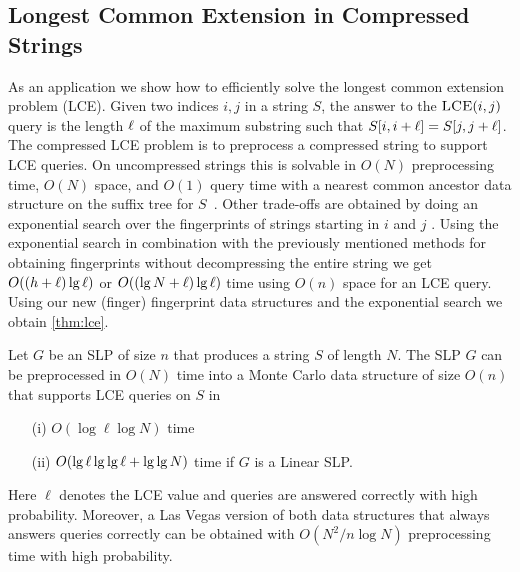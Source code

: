 \subsection*{Longest Common Extension in Compressed Strings}
As an application we show how to efficiently solve the longest common extension problem (LCE).
Given two indices $i, j$ in a string $S$, the answer to the $\textsc{LCE}(i, j)$ query is the length $\ell$ of the maximum substring such that $S[i, i+\ell] = S[j, j+\ell]$. The compressed LCE problem is to preprocess a compressed string to support LCE queries. On uncompressed strings this is solvable in $O(N)$ preprocessing time, $O(N)$ space, and $O(1)$ query time with a nearest common ancestor data structure on the suffix tree for $S$~\cite{harel1984fast}. Other trade-offs are obtained by doing an exponential search over the fingerprints of strings starting in $i$ and $j$ \cite{bille12lce}. Using the exponential search in combination with the previously mentioned methods for obtaining fingerprints without decompressing the entire string we get $O((h+\ell)\lg \ell)$ or $O((\lg N+\ell)\lg \ell)$ time using $O(n)$ space for an LCE query. Using our new (finger) fingerprint data structures and the exponential search we obtain \autoref{thm:lce}.

\begin{theorem}\label{thm:lce}
Let $G$ be an SLP of size $n$ that produces a string $S$ of length $N$. The SLP $G$ can be preprocessed in $O(N)$ time into a Monte Carlo data structure of size $O(n)$ that supports LCE queries on $S$ in
\begin{enumerate}
\item[(i)] $O(\log \ell \log N)$ time
\item[(ii)] $O(\lg \ell \lg\lg \ell + \lg\lg N)$ time if $G$ is a Linear SLP.
\end{enumerate}
Here $\ell$ denotes the LCE value and queries are answered correctly with high probability. Moreover, a Las Vegas version of both data structures that always answers queries correctly can be obtained with
$O(N^2/n \log N)$ preprocessing time with high probability.
\end{theorem}

